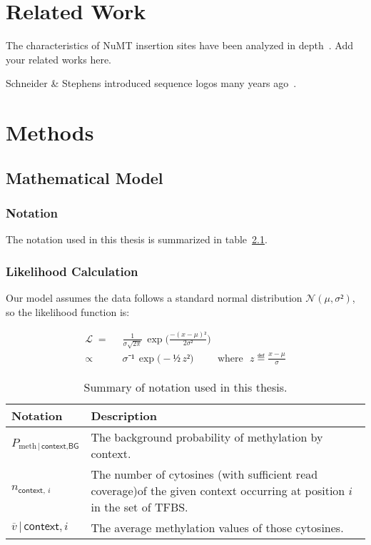 \documentclass[PhD]{PHlab-thesis}
\begin{document}
\chapter{Related Work}
The characteristics of NuMT insertion sites have been analyzed in depth~\cite{TFH12}.
Add your related works here.

Schneider \& Stephens introduced sequence logos many years ago~\cite{SS90}.



\chapter{Methods}
\section{Mathematical Model}
\subsection{Notation}
The notation used in this thesis is summarized in table~\ref{tab:notation}.

\subsection{Likelihood Calculation}
Our model assumes the data follows a standard normal distribution $𝒩(μ,σ²)$, so the likelihood function is:

\begin{align*}
ℒ  \;=&\;\;  \frac{1}{σ\sqrt{2π}}\, \exp\Big( \frac{-(x-μ)²}{2σ²}\Big)\\[.5ex]%
     ∝&\;\;  σ⁻¹\, \exp\big( -½\,z²)  \hspace{1cm} \text{where~~} z ≝ \frac{x-μ}{σ}
\end{align*}



\begin{table}
\begin{tabularx}{0.9\linewidth}{lX}
Notation                                               &  Description\\
\toprule
$P_{\text{meth}\,|\,\textsf{context,BG}}$                    &  The background probability of methylation by context.\\[.3ex]
$n_{\textsf{context},\,i}$                                 &  The number of cytosines (with sufficient read coverage)\newline of the given context occurring at position $i$ in the set of TFBS.\\[.3ex]
$\overline{v}\,|\,\scriptstyle{\textsf{context},i}$  & The average methylation values of those cytosines.\\
\bottomrule
\end{tabularx}
\caption{Summary of notation used in this thesis.}
\label{tab:notation}
\end{table}
\end{document}
